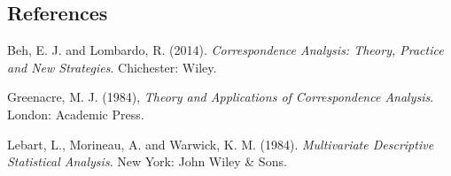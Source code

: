 \documentclass[12pt]{article}
\begin{document}
%        
%
%        

\subsection*{References}

\begin{description}

\item
Beh, E. J. and Lombardo, R. (2014). {\it Correspondence Analysis: Theory, Practice and New Strategies}. Chichester: Wiley.

\item
Greenacre, M. J. (1984), {\it Theory and Applications of Correspondence Analysis}. London: Academic Press.

\item
Lebart, L., Morineau, A. and Warwick, K. M. (1984). {\it Multivariate Descriptive Statistical Analysis}. New York: John Wiley \& Sons.

\end{description}
\end{document}
